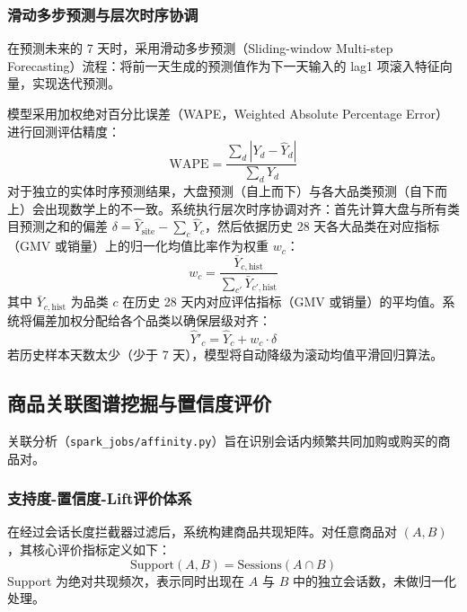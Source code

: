 \subsubsection{滑动多步预测与层次时序协调}

在预测未来的 7 天时，采用滑动多步预测（Sliding-window Multi-step Forecasting）流程：将前一天生成的预测值作为下一天输入的 lag1 项滚入特征向量，实现迭代预测。

模型采用加权绝对百分比误差（WAPE，Weighted Absolute Percentage Error）进行回测评估精度：
\begin{equation}
    \text{WAPE} = \frac{\sum_d |Y_d - \hat{Y}_d|}{\sum_d Y_d}
\end{equation}
对于独立的实体时序预测结果，大盘预测（自上而下）与各大品类预测（自下而上）会出现数学上的不一致。系统执行层次时序协调对齐：首先计算大盘与所有类目预测之和的偏差 $\delta = \hat{Y}_{\text{site}} - \sum_c \hat{Y}_c$，然后依据历史 28 天各大品类在对应指标（GMV 或销量）上的归一化均值比率作为权重 $w_c$：
\begin{equation}
    w_c = \frac{\bar{Y}_{c, \text{hist}}}{\sum_{c'} \bar{Y}_{c', \text{hist}}}
\end{equation}
其中 $\bar{Y}_{c, \text{hist}}$ 为品类 $c$ 在历史 28 天内对应评估指标（GMV 或销量）的平均值。系统将偏差加权分配给各个品类以确保层级对齐：
\begin{equation}
    \hat{Y}'_c = \hat{Y}_c + w_c \cdot \delta
\end{equation}
若历史样本天数太少（少于 7 天），模型将自动降级为滚动均值平滑回归算法。

\subsection{商品关联图谱挖掘与置信度评价}

关联分析（\texttt{spark\_jobs/affinity.py}）旨在识别会话内频繁共同加购或购买的商品对。

\subsubsection{支持度-置信度-Lift评价体系}

在经过会话长度拦截器过滤后，系统构建商品共现矩阵。对任意商品对 $(A, B)$，其核心评价指标定义如下：
\begin{equation}
    \text{Support}(A, B) = \text{Sessions}(A \cap B)
\end{equation}
Support 为绝对共现频次，表示同时出现在 $A$ 与 $B$ 中的独立会话数，未做归一化处理。

